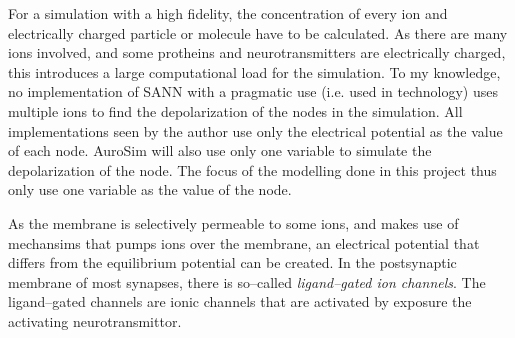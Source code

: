 %
For a simulation with a high fidelity, the concentration of every ion and electrically charged particle or molecule have to be calculated.
As there are many ions involved, and some protheins and neurotransmitters are electrically charged, this introduces a large computational load for the simulation.
To my knowledge, no implementation of SANN with a pragmatic use (i.e. used in technology) uses multiple ions to find the depolarization of the nodes in the simulation.
All implementations seen by the author use only the electrical potential as the value of each node.
AuroSim will also use only one variable to simulate the depolarization of the node.
The focus of the modelling done in this project thus only use one variable as the value of the node.







As the membrane is selectively permeable to some ions, and makes use of mechansims that pumps ions over the membrane, an electrical potential that differs from the equilibrium potential can be created. %
%
In the postsynaptic membrane of most synapses, there is so--called \emph{ligand--gated ion channels}.
The ligand--gated channels are ionic channels that are activated by exposure the activating neurotransmittor\cite{NeuroscienceExploringTheBrain3edKAP5}.

